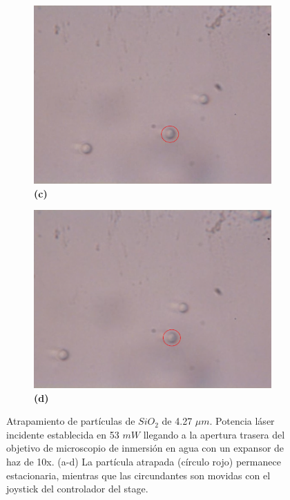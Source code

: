 \documentclass[10pt,aspectratio=1610,compress,dvipsnames]{beamer}
\begin{document}
\begin{frame}
{\begin{figure}
  \begin{subfigure}[b]{0.2\linewidth}
    \includegraphics[width=\linewidth]{427particles/i.png} %
    \caption*{\textbf{(c)}}
    \label{fig7:c}
  \end{subfigure}\hspace{0.5cm} %
  \begin{subfigure}[b]{0.2\linewidth}
    \includegraphics[width=\linewidth]{427particles/4.png} %
    \caption*{\textbf{(d)}}
    \label{fig7:d}
  \end{subfigure}
  \caption{
Atrapamiento de partículas de $SiO_2$ de 4.27 $\mu m$. Potencia láser incidente establecida en 53 $mW$ llegando a la apertura trasera del objetivo de microscopio de inmersión en agua con un expansor de haz de 10x. (a-d) La partícula atrapada (círculo rojo) permanece estacionaria, mientras que las circundantes son movidas con el joystick del controlador del stage.}
  \label{poresfrustrules}
\end{figure}}





\end{frame}
\end{document}
